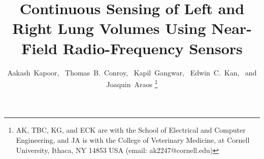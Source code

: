 \documentclass[journal]{IEEEtran}
\begin{document}
\title{Continuous Sensing of Left and Right Lung Volumes Using Near-Field Radio-Frequency Sensors}
\author{Aakash~Kapoor,~
        Thomas~B.~Conroy,~
        Kapil~Gangwar,~
        Edwin~C.~Kan,~
        and Joaquin~Araos%
\thanks{AK, TBC, KG, and ECK are with the School of Electrical and Computer Engineering, and JA is with the College of Veterinary Medicine, at Cornell University, Ithaca, NY 14853 USA (email: ak2247@cornell.edu)}}

%
% 


\maketitle
\end{document}
